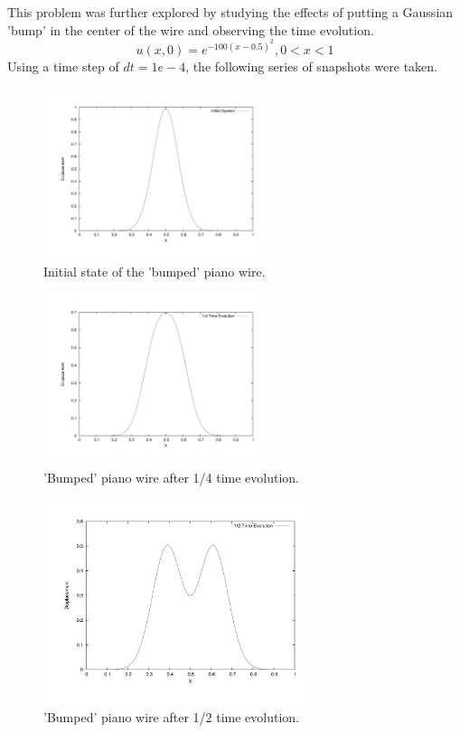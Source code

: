 \documentclass[12pt]{article}
\begin{document}
This problem was further explored by studying the effects of putting a Gaussian 'bump' in the center of the wire and observing the time evolution.
\begin{equation}
\label{gauss}
u(x,0)= e^{-100(x-0.5)^2} , 0<x<1
\end{equation}
Using a time step of $dt=1e-4$, the following series of snapshots were taken.
\begin{figure}[!h]
\centering
\includegraphics[width =110 mm, height = 50mm]{Ex_7_1_0.pdf}
\caption{Initial state of the 'bumped' piano wire.}
\label{fig:7_1_0}
\end{figure}
\begin{figure}[!h]
\centering
\includegraphics[width =110 mm, height = 50mm]{Ex_7_1_25.pdf}
\caption{'Bumped' piano wire after 1/4 time evolution.}
\label{fig:7_1_25}
\end{figure}
\begin{figure}[!h]
\centering
\includegraphics[width =110 mm, height = 60mm]{Ex_7_1_50.pdf}
\caption{'Bumped' piano wire after 1/2 time evolution.}
\label{fig:7_1_50}
\end{figure}
\end{document}
